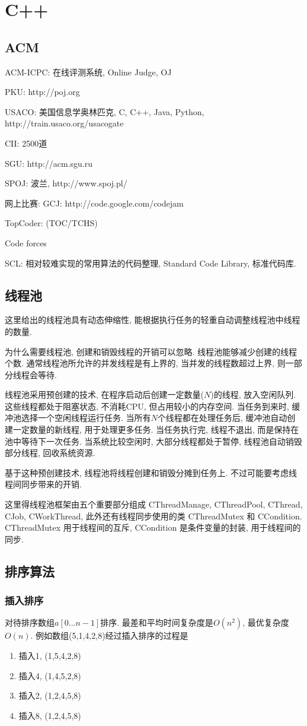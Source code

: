 \chapter{C++}
\section{ACM}
ACM-ICPC: 在线评测系统, Online Judge, OJ

PKU: http://poj.org

USACO: 美国信息学奥林匹克, C, C++, Java, Python, http://train.usaco.org/usacogate

CII: 2500道

SGU: http://acm.sgu.ru

SPOJ: 波兰, http://www.spoj.pl/

网上比赛: GCJ: http://code.google.com/codejam

TopCoder: (TOC/TCHS)

Code forces

SCL: 相对较难实现的常用算法的代码整理, Standard Code Library, 标准代码库.
\section{线程池}
这里给出的线程池具有动态伸缩性, 能根据执行任务的轻重自动调整线程池中线程的数量.

为什么需要线程池, 创建和销毁线程的开销可以忽略. 线程池能够减少创建的线程个数. 
通常线程池所允许的并发线程是有上界的, 当并发的线程数超过上界, 则一部分线程会等待.

线程池采用预创建的技术, 在程序启动后创建一定数量($N$)的线程, 放入空闲队列. 
这些线程都处于阻塞状态, 不消耗CPU, 但占用较小的内存空间. 当任务到来时, 
缓冲池选择一个空闲线程运行任务. 当所有$N$个线程都在处理任务后, 
缓冲池自动创建一定数量的新线程, 用于处理更多任务. 当任务执行完, 线程不退出,
而是保持在池中等待下一次任务. 当系统比较空闲时, 大部分线程都处于暂停, 线程池自动销毁部分线程,
回收系统资源.

基于这种预创建技术, 线程池将线程创建和销毁分摊到任务上. 不过可能要考虑线程间同步带来的开销.

这里得线程池框架由五个重要部分组成 CThreadManage, CThreadPool, CThread, CJob, 
CWorkThread, 此外还有线程同步使用的类 CThreadMutex 和 CCondition.
CThreadMutex 用于线程间的互斥, CCondition 是条件变量的封装, 用于线程间的同步.
\section{排序算法}
\subsection{插入排序}
对待排序数组$a[0...n-1]$排序.
最差和平均时间复杂度是$O(n^2)$, 最优复杂度$O(n)$. 例如数组(5,1,4,2,8)经过插入排序的过程是
\begin{enumerate}[1). ]
 \item 插入1, (1,5,4,2,8)
 \item 插入4, (1,4,5,2,8)
 \item 插入2, (1,2,4,5,8)
 \item 插入8, (1,2,4,5,8)
\end{enumerate}
